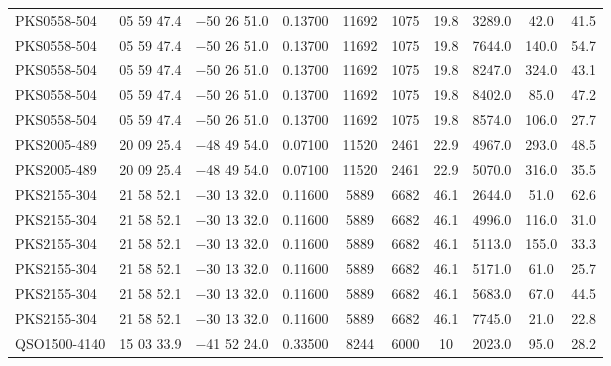 \begin{landscape}
\begin{center}
\begin{longtable}{l c c c c c c c c c}
PKS0558-504  &             05 59 47.4  &         $-$50 26 51.0  &       0.13700  & 11692  &   1075  &       19.8  &      3289.0  &  42.0  &   41.5  \\
PKS0558-504  &             05 59 47.4  &         $-$50 26 51.0  &       0.13700  & 11692  &   1075  &       19.8  &      7644.0  &  140.0  &  54.7  \\
PKS0558-504  &             05 59 47.4  &         $-$50 26 51.0  &       0.13700  & 11692  &   1075  &       19.8  &      8247.0  &  324.0  &  43.1  \\
PKS0558-504  &             05 59 47.4  &         $-$50 26 51.0  &       0.13700  & 11692  &   1075  &       19.8  &      8402.0  &  85.0  &   47.2  \\
PKS0558-504  &             05 59 47.4  &         $-$50 26 51.0  &       0.13700  & 11692  &   1075  &       19.8  &      8574.0  &  106.0  &  27.7  \\
PKS2005-489  &             20 09 25.4  &         $-$48 49 54.0  &       0.07100  & 11520  &   2461  &       22.9  &      4967.0  &  293.0  &  48.5  \\
PKS2005-489  &             20 09 25.4  &         $-$48 49 54.0  &       0.07100  & 11520  &   2461  &       22.9  &      5070.0  &  316.0  &  35.5  \\
PKS2155-304  &             21 58 52.1  &         $-$30 13 32.0  &       0.11600  & 5889  &    6682  &       46.1  &      2644.0  &  51.0  &   62.6  \\
PKS2155-304  &             21 58 52.1  &         $-$30 13 32.0  &       0.11600  & 5889  &    6682  &       46.1  &      4996.0  &  116.0  &  31.0  \\
PKS2155-304  &             21 58 52.1  &         $-$30 13 32.0  &       0.11600  & 5889  &    6682  &       46.1  &      5113.0  &  155.0  &  33.3  \\
PKS2155-304  &             21 58 52.1  &         $-$30 13 32.0  &       0.11600  & 5889  &    6682  &       46.1  &      5171.0  &  61.0  &   25.7  \\
PKS2155-304  &             21 58 52.1  &         $-$30 13 32.0  &       0.11600  & 5889  &    6682  &       46.1  &      5683.0  &  67.0  &   44.5  \\
PKS2155-304  &             21 58 52.1  &         $-$30 13 32.0  &       0.11600  & 5889  &    6682  &       46.1  &      7745.0  &  21.0  &   22.8  \\
QSO1500-4140  &            15 03 33.9  &         $-$41 52 24.0  &       0.33500  & 8244  &    6000  &       10  &        2023.0  &  95.0  &   28.2  \\

\end{longtable}
\end{center}
\end{landscape}
